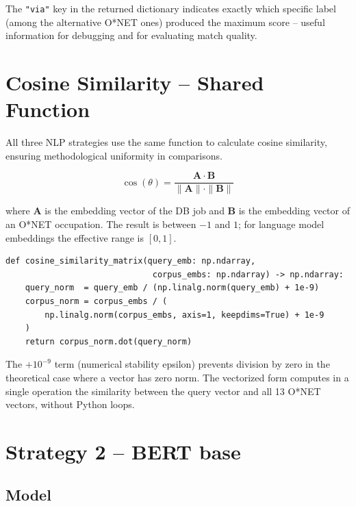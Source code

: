 \documentclass[12pt, a4paper]{report}
\begin{document}
The \texttt{"via"} key in the returned dictionary indicates exactly
which specific label (among the alternative O*NET ones) produced the
maximum score -- useful information for debugging and for evaluating
match quality.

% 
\section{Cosine Similarity -- Shared Function}

All three NLP strategies use the same function to calculate
cosine similarity, ensuring methodological uniformity in comparisons.

\begin{equation}
\cos(\theta) = \frac{\mathbf{A} \cdot \mathbf{B}}{\|\mathbf{A}\| \cdot \|\mathbf{B}\|}
\end{equation}

where $\mathbf{A}$ is the embedding vector of the DB job and $\mathbf{B}$
is the embedding vector of an O*NET occupation. The result is
between $-1$ and $1$; for language model embeddings the
effective range is $[0, 1]$.
\newpage
\begin{lstlisting}[caption={Vectorized implementation of cosine similarity}]
def cosine_similarity_matrix(query_emb: np.ndarray,
                              corpus_embs: np.ndarray) -> np.ndarray:
    query_norm  = query_emb / (np.linalg.norm(query_emb) + 1e-9)
    corpus_norm = corpus_embs / (
        np.linalg.norm(corpus_embs, axis=1, keepdims=True) + 1e-9
    )
    return corpus_norm.dot(query_norm)
\end{lstlisting}

The $+10^{-9}$ term (numerical stability epsilon) prevents
division by zero in the theoretical case where a vector has zero norm.
The vectorized form computes in a single operation the
similarity between the query vector and all 13 O*NET vectors, without
Python loops.

% 
\section{Strategy 2 -- BERT base}

\subsection{Model}
\end{document}
